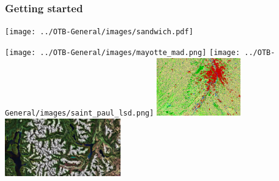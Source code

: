 \documentclass[8pt,aspectratio=169]{beamer}
\begin{document}
    \begin{frame}[fragile]
      \frametitle{Getting started}
      
      \begin{center}
        \texttt{[image: ../OTB-General/images/sandwich.pdf]}

        \vspace{0.2cm}
        
        \hspace*{-15mm} \texttt{[image: ../OTB-General/images/mayotte\_mad.png]}
        \texttt{[image: ../OTB-General/images/saint\_paul\_lsd.png]}
        \includegraphics[height=2.5cm]{../../Courses/org/WorkshopGuide/Images/final_classification.png}
        \includegraphics[height=2.5cm]{../OTB-General/images/image4_glob_each_lim20_8b_sub.jpg}

        


      \end{center}
    \end{frame}
\end{document}
